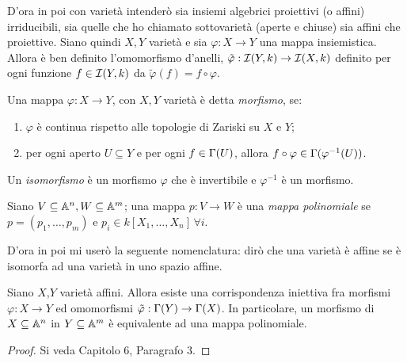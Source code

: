         D'ora in poi con varietà intenderò sia insiemi algebrici proiettivi (o affini) irriducibili, sia quelle che ho chiamato sottovarietà (aperte e chiuse) sia affini che proiettive. 
        Siano quindi $X,Y$ varietà e sia $\varphi: X \to Y$ una mappa insiemistica. Allora è ben definito l'omomorfismo d'anelli, $\tilde{\varphi}: \mathcal{I}(Y,k) \to \mathcal{I}(X,k)$ definito per 
        ogni funzione $f \in \mathcal{I}(Y,k)$ da $\tilde{\varphi}(f) = f \circ \varphi$.
        \begin{definizione}
            Una mappa $\varphi: X \to Y$, con $X,Y$ varietà è detta \emph{morfismo}, se:\begin{enumerate}
                \item $\varphi$ è continua rispetto alle topologie di Zariski su $X$ e $Y$;
                \item per ogni aperto $U \subseteq Y$ e per ogni $f \in \Gamma(U)$, allora $f \circ \varphi \in \Gamma(\varphi^{-1}(U))$.
            \end{enumerate}
            Un \emph{isomorfismo} è un morfismo $\varphi$ che è invertibile e $\varphi^{-1}$ è un morfismo.
        \end{definizione}
        \begin{definizione}
            Siano $V \subseteq \mathbb{A}^n, W \subseteq \mathbb{A}^m$; una mappa $p : V \to W$ è una \emph{mappa polinomiale} se $p = (p_1,\ldots,p_m)$ e $p_i \in k[X_1,\ldots,X_n] \, \forall i$. 
        \end{definizione}
        D'ora in poi mi userò la seguente nomenclatura: dirò che una varietà è affine se è isomorfa ad una varietà in uno spazio affine.
        \begin{proposizione}\label{prop:morph}
            Siano $X$,$Y$ varietà affini. Allora esiste una corrispondenza iniettiva fra morfismi $\varphi : X \to Y$ ed omomorfismi $\tilde{\varphi} : \Gamma(Y) \to \Gamma(X)$. In particolare, 
            un morfismo di $X \subseteq \mathbb{A}^n$ in $Y \subseteq \mathbb{A}^m$ è equivalente ad una mappa polinomiale.
        \end{proposizione}
        \begin{proof}
            Si veda \cite{fulton} Capitolo $6$, Paragrafo $3$.
        \end{proof}
